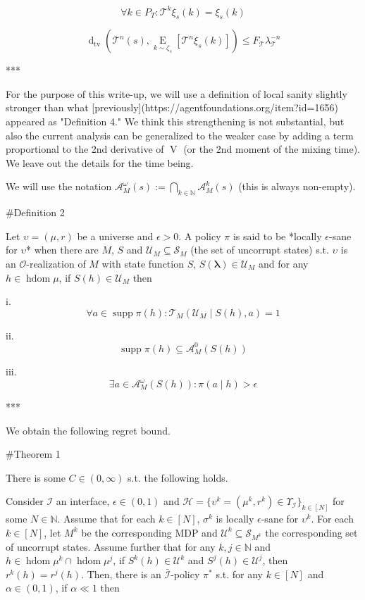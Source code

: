 \documentclass[a4paper]{article}
\DeclareMathOperator{\Supp}{supp}
\newcommand{\AP}[1]{\left(#1\right)}
\newcommand{\AB}[1]{\left[#1\right]}
\newcommand{\Ea}[2]{\underset{#1}{\operatorname{E}}\AB{#2}}
\newcommand{\Dtva}[1]{\operatorname{d}_{\text{tv}}\AP{#1}}
\newcommand{\Nats}{\mathbb{N}}
\newcommand{\Estr}{\boldsymbol{\lambda}}
\newcommand{\Ob}{\mathcal{O}}
\newcommand{\A}{\mathcal{A}}
\newcommand{\St}{\mathcal{S}}
\newcommand{\T}{\mathcal{T}}
\newcommand{\In}{\mathcal{I}}
\DeclareMathOperator{\HD}{hdom}
\newcommand{\Hy}{\mathcal{H}}
\newcommand{\UC}{\mathcal{U}}
\newcommand{\V}{\operatorname{V}}
\newcommand{\Pd}{P}
\begin{document}
$$\forall k \in \Pd_T: \T^k \xi_s(k) = \xi_s(k)$$

$$\Dtva{\T^n(s),\Ea{k \sim \zeta_s}{\T^n \xi_s(k)}} \leq F_\T \lambda_{\T}^{-n}$$

***

For the purpose of this write-up, we will use a definition of local sanity slightly stronger than what [previously](https://agentfoundations.org/item?id=1656) appeared as "Definition 4." We think this strengthening is not substantial, but also the current analysis can be generalized to the weaker case by adding a term proportional to the 2nd derivative of $\V$ (or the 2nd moment of the mixing time). We leave out the details for the time being.

We will use the notation $\A_M^\omega(s) := \bigcap_{k \in \Nats} \A_M^k(s)$ (this is always non-empty).

\#Definition 2

Let $\upsilon = (\mu,r)$ be a universe and $\epsilon > 0$. A policy $\pi$ is said to be *locally $\epsilon$-sane for $\upsilon$* when there are $M$, $S$ and $\UC_M \subseteq \St_M$ (the set of uncorrupt states) s.t. $\upsilon$ is an $\Ob$-realization of $M$ with state function $S$, $S(\Estr) \in \UC_M$ and for any $h \in \HD{\mu}$, if $S(h) \in \UC_M$ then

i. $$\forall a \in \Supp{\pi(h)}: \T_M\AP{\UC_M \mid S(h),a} = 1$$

ii. $$\Supp{\pi(h)} \subseteq \A_M^0\left(S(h)\right)$$

iii. $$\exists a \in \A_M^\omega\left(S(h)\right): \pi(a \mid h) > \epsilon$$

***

We obtain the following regret bound.

\#Theorem 1

There is some $C \in (0,\infty)$ s.t. the following holds.

Consider $\In$ an interface, $\epsilon \in (0,1)$ and $\Hy = \{\upsilon^k = (\mu^k,r^k) \in \Upsilon_{\In}\}_{k \in [N]}$ for some $N \in \Nats$. Assume that for each $k \in [N]$, $\sigma^k$ is locally $\epsilon$-sane for $\upsilon^k$. For each $k \in [N]$, let $M^k$ be the corresponding MDP and $\UC^k \subseteq \St_{M^k}$ the corresponding set of uncorrupt states. Assume further that for any $k,j \in \Nats$ and $h \in \HD{\mu^k} \cap \HD{\mu^j}$, if $S^k(h) \in \UC^k$ and $S^j(h) \in \UC^j$, then $r^k(h)=r^j(h)$. Then, there is an $\bar{\In}$-policy $\pi^*$ s.t. for any $k \in [N]$ and $\alpha \in (0,1)$, if $\alpha \ll 1$ then
\end{document}
